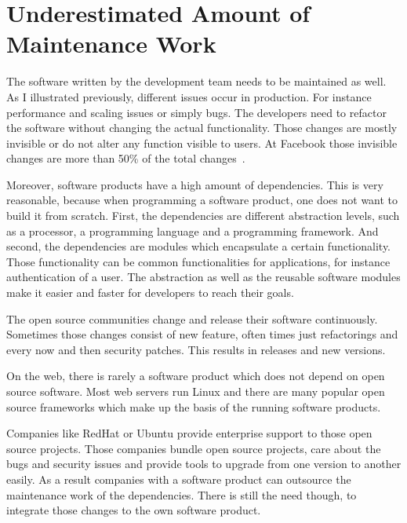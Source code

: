 \section{Underestimated Amount of Maintenance Work}

The software written by the development team needs to be maintained as well. As I
illustrated previously, different issues occur in production. For instance performance and
scaling issues or simply bugs. The developers need to refactor the software without
changing the actual functionality. Those changes are mostly invisible or do not alter any
function visible to users. At Facebook those invisible changes are more than 50\% of the
total changes~\cite{dev_at_fb}.

Moreover, software products have a high amount of dependencies. This is very reasonable,
because when programming a software product, one does not want to build it from
scratch. First, the dependencies are different abstraction levels, such as a processor,
a programming language and a programming framework. And second, the dependencies are
modules which encapsulate a certain functionality. Those functionality can be common
functionalities for applications, for instance authentication of a user. The abstraction
as well as the reusable software modules make it easier and faster for developers to reach
their goals.

The open source communities change and release their software continuously. Sometimes
those changes consist of new feature, often times just refactorings and every now and then
security patches. This results in releases and new versions.

On the web, there is rarely a software product which does not depend on open source
software. Most web servers run Linux and there are many popular open source frameworks
which make up the basis of the running software products.

Companies like RedHat or Ubuntu provide enterprise support to those open source
projects. Those companies bundle open source projects, care about the bugs and
security issues and provide tools to upgrade from one version to another easily. As a
result companies with a software product can outsource the maintenance work of the
dependencies. There is still the need though, to integrate those changes to the own
software product.

